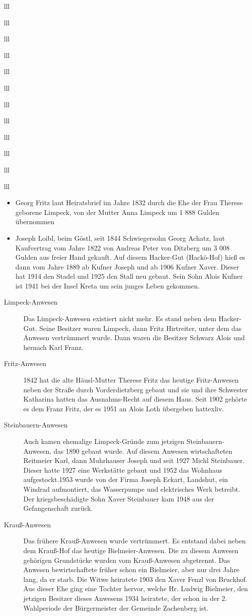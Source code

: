 \documentclass[12pt,a4pager]{book}
\begin{document}
\begin{tabuluar}{lll}
\begin{tabuluar}{lll}
\begin{tabuluar}{lll}
\begin{tabuluar}{lll}
\begin{tabuluar}{lll}
\begin{tabuluar}{lll}
\begin{tabuluar}{lll}
\begin{tabuluar}{lll}
\begin{tabuluar}{lll}
\begin{tabuluar}{lll}
\begin{tabuluar}{lll}
\begin{tabuluar}{lll}
\begin{itemize}
\item Georg Fritz laut Heiratsbrief im Jahre 1832 durch die Ehe der Frau Therese
geborene Limpeck, von der Mutter Anna Limpeck um 1 888 Gulden übernommen

\item Joseph Loibl, beim Göstl, seit 1844 Schwiegersohn Georg Achatz, laut
Kaufvertrag vom Jahre 1822 von Andreas Peter von Ditzberg um 3 008 Gulden aus
freier Hand gekauft. Auf diesem Hacker-Gut (Hackö-Hof) hieß es dann vom Jahre
1889 ab Kufner Joseph und ab 1906 Kufner Xaver. Dieser hat 1914 den Stadel und
1925 den Stall neu gebaut. Sein Sohn Alois Kufner ist 1941 bei der Insel Kreta
um sein junges Leben gekommen.
\end{itemize}

\begin{description}
\item[Limpeck-Anwesen] Das Limpeck-Anwesen existiert nicht mehr. Es stand neben
dem Hacker-Gut. Seine Besitzer waren Limpeck, dann Fritz Hirtreiter, unter dem
das Anwesen vertrümmert wurde. Dann waren die Besitzer Schwarz Alois und hernach
Karl Franz.

\item[Fritz-Anwesen] 1842 hat die alte Häusl-Mutter Therese Fritz das heutige
Fritz-Anwesen neben der Straße durch Vorderdietzberg gebaut und sie und ihre
Schwester Katharina hatten das Ausnahms-Recht auf diesem Haus. Seit 1902 gehörte
es dem Franz Fritz, der es 1951 an Alois Loth übergeben hattexliv.

\item[Steinbauern-Anwesen] Auch kamen ehemalige Limpeck-Gründe zum jetzigen
Steinbauern-Anwesen, das 1890 gebaut wurde. Auf diesem Anwesen wirtschafteten
Reitmeier Karl, dann Muhrhauser Joseph und seit 1927 Michl Steinbauer. Dieser
hatte 1927 eine Werkstätte gebaut und 1952 das Wohnhaus aufgestockt.1953 wurde
von der Firma Joseph Eckart, Landshut, ein Windrad aufmontiert, das Wasserpumpe
und elektrisches Werk betreibt. Der kriegsbeschädigte Sohn Xaver Steinbauer kam
1948 aus der Gefangenschaft zurück.

\item[Krauß-Anwesen] Das frühere Krauß-Anwesen wurde vertrümmert. Es entstand
dabei neben dem Krauß-Hof das heutige Bielmeier-Anwesen. Die zu diesem Anwesen
gehörigen Grundstücke wurden vom Krauß-Anwesen abgetrennt. Das Anwesen
bewirtschaftete früher schon ein Bielmeier, aber nur drei Jahre lang, da er
starb. Die Witwe heiratete 1903 den Xaver Fenzl von Bruckhof. Aus dieser Ehe
ging eine Tochter hervor, welche Hr. Ludwig Bielmeier, den jetzigen Besitzer
dieses Anwesens 1934 heiratete, der schon in der 2. Wahlperiode der
Bürgermeister der Gemeinde Zachenberg ist.


\end{description}
\end{tabuluar}
\end{tabuluar}
\end{tabuluar}
\end{tabuluar}
\end{tabuluar}
\end{tabuluar}
\end{tabuluar}
\end{tabuluar}
\end{tabuluar}
\end{tabuluar}
\end{tabuluar}
\end{tabuluar}
\end{document}
